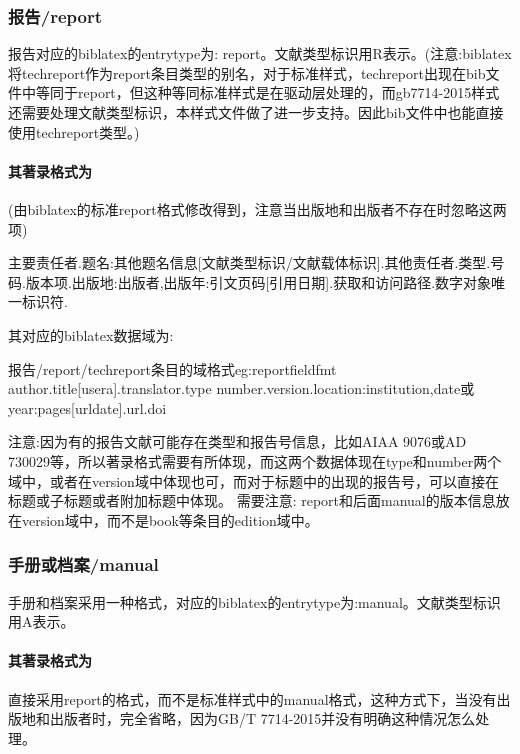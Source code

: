 \subsubsection{报告/report}
\begin{refentry}{}{}
报告对应的biblatex的entrytype为: report。文献类型标识用R表示。(注意:biblatex将techreport作为report条目类型的别名，对于标准样式，techreport出现在bib文件中等同于report，但这种等同标准样式是在驱动层处理的，而gb7714-2015样式还需要处理文献类型标识，本样式文件做了进一步支持。因此bib文件中也能直接使用techreport类型。)

\paragraph{其著录格式为} (由biblatex的标准report格式修改得到，注意当出版地和出版者不存在时忽略这两项)

主要责任者.题名:其他题名信息[文献类型标识/文献载体标识].其他责任者.类型.号码.版本项.出版地:出版者,出版年:引文页码[引用日期].获取和访问路径.数字对象唯一标识符.
\end{refentry}

其对应的biblatex数据域为:
\begin{codetex}{报告/report/techreport条目的域格式}{eg:reportfieldfmt}
author.title[usera].translator.type number.version.location:institution,date或year:pages[urldate].url.doi
\end{codetex}

注意:因为有的报告文献可能存在类型和报告号信息，比如AIAA 9076或AD 730029等，所以著录格式需要有所体现，而这两个数据体现在type和number两个域中，或者在version域中体现也可，而对于标题中的出现的报告号，可以直接在标题或子标题或者附加标题中体现。
需要注意: report和后面manual的版本信息放在version域中，而不是book等条目的edition域中。

\subsubsection{手册或档案/manual}
\begin{refentry}{}{}
手册和档案采用一种格式，对应的biblatex的entrytype为:manual。文献类型标识用A表示。

\paragraph{其著录格式为} 直接采用report的格式，而不是标准样式中的manual格式，这种方式下，当没有出版地和出版者时，完全省略，因为GB/T 7714-2015并没有明确这种情况怎么处理。
\end{refentry}



